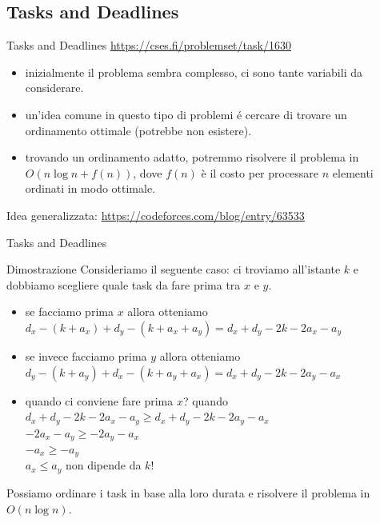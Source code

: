 \documentclass[compress]{beamer}
\begin{document}
\subsection{Tasks and Deadlines}
\begin{frame}{Tasks and Deadlines}
    \underline{\url{https://cses.fi/problemset/task/1630}}
    \pause
    \begin{itemize}
        \item inizialmente il problema sembra complesso, ci sono tante variabili da considerare.
        \pause
        \item un'idea comune in questo tipo di problemi \'e cercare di trovare un ordinamento ottimale (potrebbe non esistere).
        \pause 
\item trovando un ordinamento adatto, potremmo risolvere il problema in $O(n \log n + f(n))$, dove $f(n)$ \`e il costo per processare $n$ elementi ordinati in modo ottimale.
    \end{itemize}
    \vfill
    Idea generalizzata: \url{https://codeforces.com/blog/entry/63533}
\end{frame}

\begin{frame}{Tasks and Deadlines}
    \begin{block}{Dimostrazione}
        Consideriamo il seguente caso: ci troviamo all'istante $k$ e dobbiamo scegliere quale task da fare prima tra $x$ e $y$.
        \begin{itemize}
            \pause
            \item se facciamo prima $x$ allora otteniamo $d_x-(k+a_x)+ d_y-(k+a_x+a_y) = d_x+d_y-2k-2a_x-a_y$
            \item se invece facciamo prima $y$ allora otteniamo $d_y-(k+a_y)+ d_x-(k+a_y+a_x) = d_x+d_y-2k-2a_y-a_x$
            \pause
            \item quando ci conviene fare prima $x$? quando \\ $d_x+d_y-2k-2a_x-a_y \geq d_x+d_y-2k-2a_y-a_x$ \\ \pause $-2a_x-a_y \geq -2a_y-a_x$  \pause \\ $-a_x \geq -a_y$ \\ $a_x \leq a_y$  non dipende da $k$!
        \end{itemize}
    \end{block}
    \pause
    Possiamo ordinare i task in base alla loro durata e risolvere il problema in $O(n \log n)$.
\end{frame}
\end{document}
